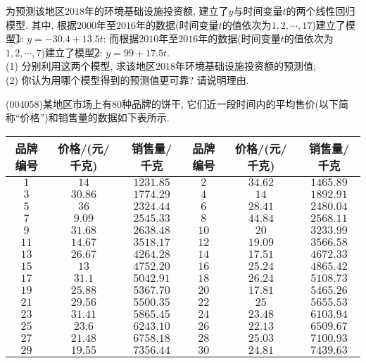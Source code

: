 为预测该地区$2018$年的环境基础设施投资额, 建立了$y$与时间变量$t$的两个线性回归模型. 其中, 根据$2000$年至$2016$年的数据(时间变量$t$的值依次为$1,2,\cdots,17$)建立了模型\textcircled{1}: $y=-30.4+13.5t$; 而根据$2010$年至$2016$年的数据(时间变量$t$的值依次为$1,2,\cdots,7$)建立了模型\textcircled{2}: $y=99+17.5t$.\\
(1) 分别利用这两个模型, 求该地区$2018$年环境基础设施投资额的预测值;\\
(2) 你认为用哪个模型得到的预测值更可靠? 请说明理由.
\item (004058)某地区市场上有$80$种品牌的饼干, 它们近一段时间内的平均售价(以下简称``价格'')和销售量的数据如下表所示.
\begin{center}
    \begin{longtable}{|c|c|c||c|c|c|}
        \hline
        品牌编号 & 价格/(元/千克) & 销售量/千克 & 品牌编号 & 价格/(元/千克) & 销售量/千克\\ \hline
        \endhead
        $1$ & $14$ & $1231.85$ & $2$ & $34.62$ & $1465.89$ \\ \hline
        $3$ & $30.86$ & $1774.29$ & $4$ & $14$ & $1892.91$ \\ \hline
        $5$ & $36$ & $2324.44$ & $6$ & $28.41$ & $2480.04$ \\ \hline
        $7$ & $9.09$ & $2545.33$ & $8$ & $44.84$ & $2568.11$ \\ \hline
        $9$ & $31.68$ & $2638.48$ & $10$ & $20$ & $3233.99$ \\ \hline
        $11$ & $14.67$ & $3518.17$ & $12$ & $19.09$ & $3566.58$ \\ \hline
        $13$ & $26.67$ & $4264.28$ & $14$ & $17.51$ & $4672.33$ \\ \hline
        $15$ & $13$ & $4752.20$ & $16$ & $25.24$ & $4865.42$ \\ \hline
        $17$ & $31.1$ & $5042.91$ & $18$ & $26.24$ & $5108.73$ \\ \hline
        $19$ & $25.88$ & $5367.70$ & $20$ & $17.81$ & $5465.26$ \\ \hline
        $21$ & $29.56$ & $5500.35$ & $22$ & $25$ & $5655.53$ \\ \hline
        $23$ & $31.41$ & $5865.45$ & $24$ & $23.48$ & $6103.94$ \\ \hline
        $25$ & $23.6$ & $6243.10$ & $26$ & $22.13$ & $6509.67$ \\ \hline
        $27$ & $21.48$ & $6758.18$ & $28$ & $25.03$ & $7100.93$ \\ \hline
        $29$ & $19.55$ & $7356.44$ & $30$ & $24.81$ & $7439.63$ \\ \hline

\end{longtable}
\end{center}
